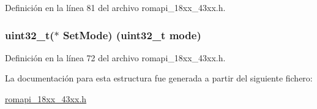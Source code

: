 Definición en la línea 81 del archivo romapi\+\_\+18xx\+\_\+43xx.\+h.

\subsubsection[{\texorpdfstring{Set\+Mode}{SetMode}}]{\setlength{\rightskip}{0pt plus 5cm}uint32\+\_\+t($\ast$ Set\+Mode) (uint32\+\_\+t mode)}\hypertarget{struct_a_e_s___a_p_i___t_ab1fdde69b99912ece1b9950581cec0a6}{}\label{struct_a_e_s___a_p_i___t_ab1fdde69b99912ece1b9950581cec0a6}


Definición en la línea 72 del archivo romapi\+\_\+18xx\+\_\+43xx.\+h.



La documentación para esta estructura fue generada a partir del siguiente fichero\+:\begin{DoxyCompactItemize}
\item 
\hyperlink{romapi__18xx__43xx_8h}{romapi\+\_\+18xx\+\_\+43xx.\+h}\end{DoxyCompactItemize}
